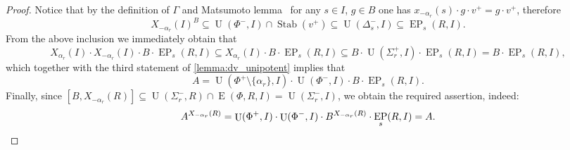 \documentclass[11pt]{amsart}
\theoremstyle{plain}
\numberwithin{equation}{section}
\numberwithin{lemma}{section}
\theoremstyle{definition}
\theoremstyle{remark}
\DeclareMathOperator{\E}{E}
\DeclareMathOperator{\EP}{EP}
\DeclareMathOperator{\U}{U}
\DeclareMathOperator{\Stab}{Stab}
\begin{document}
\begin{proof}
Notice that by the definition of $\Gamma$ and Matsumoto lemma~\cite[Lemma~2.3]{Ma69} for any $s\in I$, $ g\in B$ one has $x_{-\alpha_r}(s) \cdot g \cdot v^+ = g \cdot v^+$, therefore
\[ X_{-\alpha_{r}}(I)^{B} \subseteq \U(\Phi^-, I) \cap \Stab(v^+) \subseteq \U(\Delta_s^-, I) \subseteq \EP_s(R, I). \]
From the above inclusion we immediately obtain that
\begin{equation*} X_{\alpha_r}(I) \cdot X_{-\alpha_r}(I) \cdot B \cdot \EP_s(R, I) \subseteq X_{\alpha_r}(I) \cdot B \cdot \EP_s(R, I) \subseteq B \cdot \U(\Sigma_r^+, I) \cdot \EP_s(R, I) = B \cdot \EP_s(R, I), \end{equation*}
which together with the third statement of \cref{lemma:dv_unipotent} implies that
\begin{equation*} \label{rel:sred}
A = \U(\Phi^+\setminus\{\alpha_r\}, I) \cdot \U(\Phi^-, I) \cdot B \cdot \EP_s(R, I).
\end{equation*}
Finally, since $[B, X_{-\alpha_r}(R)] \subseteq \U(\Sigma_r^-, R) \cap \E(\Phi, R, I) = \U(\Sigma_r^-, I)$, we obtain the required assertion, indeed:
\begin{equation*} \label{rel:ninv} A^{X_{-\alpha_{r}}(R)} = \U(\Phi^+, I) \cdot \U(\Phi^-, I) \cdot B ^{X_{-\alpha_{r}}(R)} \cdot \EP_s(R, I) = A. \qedhere \end{equation*}
\end{proof}
\end{document}
